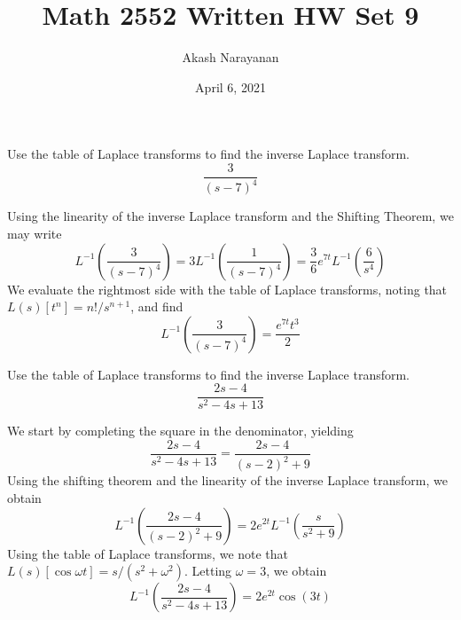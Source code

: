 \documentclass[11pt, titlepage]{article}
\title{Math 2552 Written HW Set 9}
\author{Akash Narayanan}
\date{April 6, 2021}
\begin{document}
    \maketitle

    \begin{problem}[Trench 8.2.1a]
        Use the table of Laplace transforms to find the inverse Laplace
        transform.
        \[
            \frac{3}{(s-7)^{4}}
        \]
    \end{problem}

    \begin{solution}
        Using the linearity of the inverse Laplace transform and the Shifting
        Theorem, we may write
        \[
            L^{-1} \left( \frac{3}{(s-7)^{4}} \right) = 3 L^{-1} \left(
                \frac{1}{(s-7)^{4}} \right) = \frac{3}{6} e^{7t} L^{-1}
                \left(\frac{6}{s^{4}} \right)
        \] 
        We evaluate the rightmost side with the table of Laplace transforms,
        noting that $L(s)[t^{n}] = n! / s^{n+1}$, and find
        \[
            L^{-1} \left(\frac{3}{(s-7)^{4}} \right) = \frac{e^{7t} t^3}{2}
        \] 

    \end{solution}

    \pagebreak

    \begin{problem}[Trench 8.2.1b] 
        Use the table of Laplace transforms to find the inverse Laplace
        transform.
        \[
            \frac{2s - 4}{s^2 - 4s + 13}
        \]
    \end{problem}

    \begin{solution}
        We start by completing the square in the denominator, yielding
        \[
            \frac{2s - 4}{s^2 - 4s + 13} = \frac{2s - 4}{(s - 2)^2 + 9}
        \] 
        Using the shifting theorem and the linearity of the inverse Laplace
        transform, we obtain
        \[
            L^{-1} \left( \frac{2s - 4}{(s - 2)^2 + 9} \right) = 2 e^{2t} L^{-1}
                \left(\frac{s}{s^2 + 9} \right)
        \] 
        Using the table of Laplace transforms, we note that $L(s)[\cos \omega t]
        = s / (s^2 + \omega^2)$. Letting $\omega = 3$, we obtain
        \[
            L^{-1} \left(\frac{2s-4}{s^2-4s+13} \right) = 2e^{2t}\cos(3t)
        \] 
    \end{solution}

    \pagebreak
\end{document}
